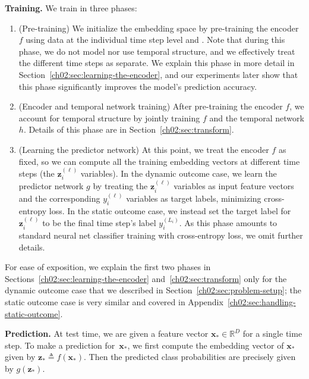 \noindent
\textbf{Training.}
We train  in three phases:
\begin{enumerate}

\item (Pre-training) We initialize the embedding space by pre-training the encoder~$f$ using data at the individual time step level and \mbox{}. 
Note that during this phase, we do not model nor use temporal structure, and we effectively treat the different time steps as separate.
We explain this phase in more detail in Section~\ref{ch02:sec:learning-the-encoder}, and our experiments later show that this phase significantly improves the model's prediction accuracy.

\item (Encoder and temporal network training) After pre-training the encoder $f$, we account for temporal structure by jointly training $f$ and the temporal network $h$.
Details of this phase are in Section~\ref{ch02:sec:transform}.

\item (Learning the predictor network) At this point, we treat the encoder $f$ as fixed, so we can compute all the training embedding vectors at different time steps (the $\mathbf{z}_i^{(\ell)}$ variables).
In the dynamic outcome case, we learn the predictor network $g$ by treating the $\mathbf{z}_i^{(\ell)}$ variables as input feature vectors and the corresponding $y_i^{(\ell)}$ variables as target labels, minimizing cross-entropy loss.
In the static outcome case, we instead set the target label for $\mathbf{z}_i^{(\ell)}$ to be the final time step's label $y_i^{(L_i)}$.
As this phase amounts to standard neural net classifier training with cross-entropy loss, we omit further details.

\end{enumerate}
For ease of exposition, we explain the first two phases in Sections~\ref{ch02:sec:learning-the-encoder} and~\ref{ch02:sec:transform} only for the dynamic outcome case that we described in Section~\ref{ch02:sec:problem-setup}; the static outcome case is very similar and covered in Appendix~\ref{ch02:sec:handling-static-outcome}.


\noindent
\textbf{Prediction.}
At test time, we are given a feature vector $\mathbf{x}_*\in\mathbb{R}^{D}$ for a single time step.
To make a prediction for~$\mathbf{x}_*$, we first compute the embedding vector of $\mathbf{x}_*$ given by $\mathbf{z}_* \triangleq  f(\mathbf{x}_*)$.
Then the predicted class probabilities are precisely given by $g(\mathbf{z}_*)$.


